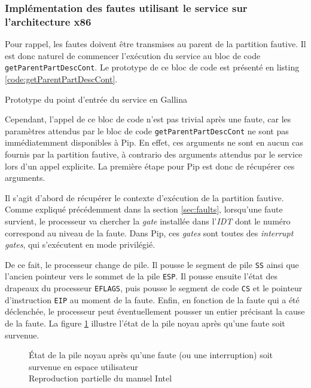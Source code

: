 		\subsubsection{Implémentation des fautes utilisant le service sur l'architecture x86}

		Pour rappel, les fautes doivent être transmises au parent de la partition fautive. Il est donc naturel de commencer l'exécution du service au bloc de code \texttt{getParentPartDescCont}. Le prototype de ce bloc de code est présenté en listing \ref{code:getParentPartDescCont}.

		\begin{listing}[!ht]
			\caption{Prototype du point d'entrée du service en Gallina}
			\label{code:getParentPartDescCont}
		\end{listing}

		Cependant, l'appel de ce bloc de code n'est pas trivial après une faute, car les paramètres attendus par le bloc de code \texttt{getParentPartDescCont} ne sont pas immédiatemment disponibles à Pip. En effet, ces arguments ne sont en aucun cas fournis par la partition fautive, à contrario des arguments attendus par le service lors d'un appel explicite. La première étape pour Pip est donc de récupérer ces arguments. 

		Il s'agit d'abord de récupérer le contexte d'exécution de la partition fautive. Comme expliqué précédemment dans la section \ref{sec:faults}, lorsqu'une faute survient, le processeur va chercher la \emph{gate} installée dans l'\emph{IDT} dont le numéro correspond au niveau de la faute. Dans Pip, ces \emph{gates} sont toutes des \emph{interrupt gates}, qui s'exécutent en mode privilégié.

		De ce fait, le processeur change de pile. Il pousse le segment de pile \texttt{SS} ainsi que l'ancien pointeur vers le sommet de la pile \texttt{ESP}. Il pousse ensuite l'état des drapeaux du processeur \texttt{EFLAGS}, puis pousse le segment de code \texttt{CS} et le pointeur d'instruction \texttt{EIP} au moment de la faute. Enfin, en fonction de la faute qui a été déclenchée, le processeur peut éventuellement pousser un entier précisant la cause de la faute. La figure \ref{fig:proc_interrupt_stack} illustre l'état de la pile noyau après qu'une faute soit survenue.

		\begin{figure}[!ht]
			
			\caption{État de la pile noyau après qu'une faute (ou une interruption) soit survenue en espace utilisateur\\Reproduction partielle du manuel Intel \cite{intel_interrupt_stack}}
			\label{fig:proc_interrupt_stack}
		\end{figure}


